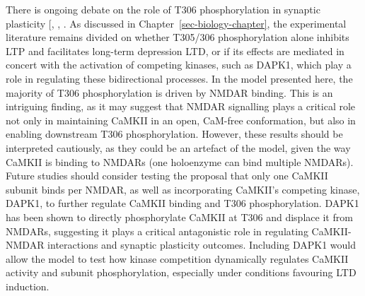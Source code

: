 \documentclass[
  11pt,
  letterpaper,
]{scrreprt}
\begin{document}
There is ongoing debate on the role of T306 phosphorylation in synaptic
plasticity {[},
,
\citeproc{ref-cook2021CaMKIIb}{198}{]}. As discussed in
Chapter~\ref{sec-biology-chapter}, the experimental literature remains
divided on whether T305/306 phosphorylation alone inhibits LTP and
facilitates long-term depression LTD, or if its effects are mediated in
concert with the activation of competing kinases, such as DAPK1, which
play a role in regulating these bidirectional processes. In the model
presented here, the majority of T306 phosphorylation is driven by NMDAR
binding. This is an intriguing finding, as it may suggest that NMDAR
signalling plays a critical role not only in maintaining CaMKII in an
open, CaM-free conformation, but also in enabling downstream T306
phosphorylation. However, these results should be interpreted
cautiously, as they could be an artefact of the model, given the way
CaMKII is binding to NMDARs (one holoenzyme can bind multiple NMDARs).
Future studies should consider testing the proposal that only one CaMKII
subunit binds per NMDAR, as well as incorporating CaMKII's competing
kinase, DAPK1, to further regulate CaMKII binding and T306
phosphorylation. DAPK1 has been shown to directly phosphorylate CaMKII
at T306 and displace it from NMDARs, suggesting it plays a critical
antagonistic role in regulating CaMKII-NMDAR interactions and synaptic
plasticity outcomes. Including DAPK1 would allow the model to test how
kinase competition dynamically regulates CaMKII activity and subunit
phosphorylation, especially under conditions favouring LTD induction.
\end{document}
